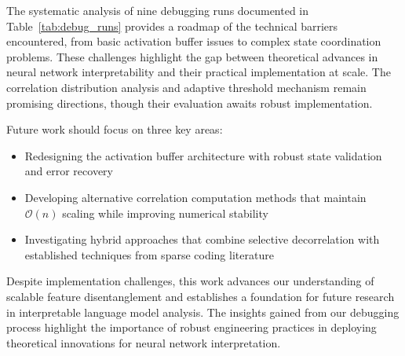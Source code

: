 \documentclass{article} %
\begin{document}
The systematic analysis of nine debugging runs documented in Table~\ref{tab:debug_runs} provides a roadmap of the technical barriers encountered, from basic activation buffer issues to complex state coordination problems. These challenges highlight the gap between theoretical advances in neural network interpretability and their practical implementation at scale. The correlation distribution analysis and adaptive threshold mechanism remain promising directions, though their evaluation awaits robust implementation.

Future work should focus on three key areas:
\begin{itemize}
    \item Redesigning the activation buffer architecture with robust state validation and error recovery
    \item Developing alternative correlation computation methods that maintain $\mathcal{O}(n)$ scaling while improving numerical stability
    \item Investigating hybrid approaches that combine selective decorrelation with established techniques from sparse coding literature
\end{itemize}

Despite implementation challenges, this work advances our understanding of scalable feature disentanglement and establishes a foundation for future research in interpretable language model analysis. The insights gained from our debugging process highlight the importance of robust engineering practices in deploying theoretical innovations for neural network interpretation.



\end{document}
